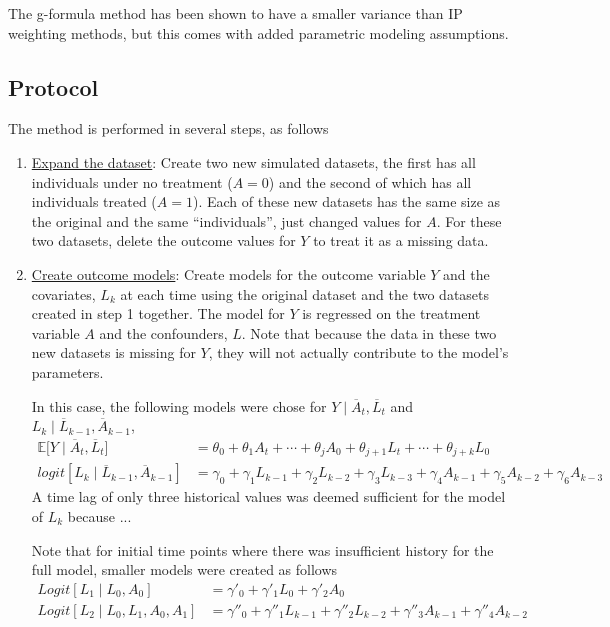 The g-formula method has been shown to have a smaller variance than IP weighting methods, but this comes with added parametric modeling assumptions.\cite{young2011comparative} 

\subsection{Protocol} 
The method is performed in several steps, as follows 
\begin{enumerate}
\item \underline{Expand the dataset}: Create two new simulated datasets, the first has all individuals under no treatment ($A=0$) and the second of which has all individuals treated ($A=1$).  Each of these new datasets has the same size as the original and the same ``individuals'', just changed values for $A$.  For these two datasets, delete the outcome values for $Y$ to treat it as a missing data.  

\item \underline{Create outcome models}: Create models for the outcome variable $Y$ and the covariates, $L_k$ at each time using the original dataset and the two datasets created in step 1 together.  The model for $Y$ is regressed on the treatment variable $A$ and the confounders, $L$.  Note that because the data in these two new datasets is missing for $Y$, they will not actually contribute to the model's parameters.  

In this case, the following models were chose for $Y \mid  \overline{A}_t, \overline{L}_t$ and $L_k \mid \overline{L}_{k-1}, \overline{A}_{k-1}$, 
\begin{align} 
\mathbb{E} \big[Y \mid \overline{A}_t, \overline{L}_t \big] &= \theta_{0} + \theta_1 A_{t} + \cdots + \theta_j A_0 + \theta_{j+1} L_t + \cdots + \theta_{j+k} L_0 \label{eq:2} \\ 
logit[L_k \mid \overline{L}_{k-1}, \overline{A}_{k-1}] &= \gamma_0 + \gamma_1 L_{k-1} + \gamma_2 L_{k-2} + \gamma_3 L_{k-3}  + \gamma_4 A_{k-1} + \gamma_5 A_{k-2} + \gamma_6 A_{k-3} \label{eq:3} 
\end{align} 
A time lag of only three historical values was deemed sufficient for the model of $L_k$ because ... 


\vspace{1cm}
Note that for initial time points where there was insufficient history for the full model, smaller models were created as follows 
\begin{align} 
Logit[L_1 \mid L_0, A_0]  &= \gamma'_0 + \gamma'_1 L_0 +  \gamma'_2 A_0 \label{eq:4} \\
Logit[L_2 \mid L_0, L_1, A_0, A_1] &= \gamma''_0 + \gamma''_1 L_{k-1} + \gamma''_2 L_{k-2}   + \gamma''_3 A_{k-1} + \gamma''_4 A_{k-2} \label{eq:5}
\end{align}



\end{enumerate}
